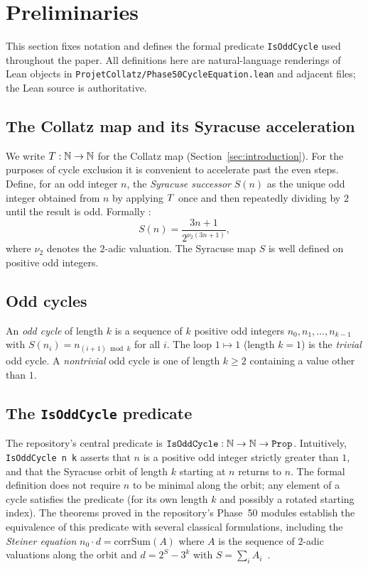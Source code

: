 
\section{Preliminaries}
\label{sec:preliminaries}

This section fixes notation and defines the formal predicate
\texttt{IsOddCycle} used throughout the paper. All definitions here are
natural-language renderings of Lean objects in
\texttt{ProjetCollatz/Phase50CycleEquation.lean} and adjacent files; the
Lean source is authoritative.

\subsection{The Collatz map and its Syracuse acceleration}

We write \(T : \mathbb{N} \to \mathbb{N}\) for the Collatz map
(Section~\ref{sec:introduction}). For the purposes of cycle exclusion it
is convenient to accelerate past the even steps. Define, for an odd
integer \(n\), the \emph{Syracuse successor} \(S(n)\) as the unique odd
integer obtained from \(n\) by applying \(T\) once and then
repeatedly dividing by \(2\) until the result is odd. Formally :
\[
S(n) = \frac{3n + 1}{2^{\nu_2(3n+1)}},
\]
where \(\nu_2\) denotes the \(2\)-adic valuation. The Syracuse map \(S\)
is well defined on positive odd integers.

\subsection{Odd cycles}

An \emph{odd cycle} of length \(k\) is a sequence of \(k\) positive odd
integers \(n_0, n_1, \ldots, n_{k-1}\) with
\(S(n_i) = n_{(i+1) \bmod k}\) for all \(i\). The loop
\(1 \mapsto 1\) (length \(k = 1\)) is the \emph{trivial} odd cycle.
A \emph{nontrivial} odd cycle is one of length \(k \geq 2\) containing a
value other than \(1\).

\subsection{The \texttt{IsOddCycle} predicate}

The repository's central predicate is
\(\mathtt{IsOddCycle} : \mathbb{N} \to \mathbb{N} \to \mathtt{Prop}\). Intuitively,
\texttt{IsOddCycle n k} asserts that \(n\) is a positive odd integer
strictly greater than \(1\), and that the Syracuse orbit of length
\(k\) starting at \(n\) returns to \(n\). The formal definition does
not require \(n\) to be minimal along the orbit; any element of a
cycle satisfies the predicate (for its own length \(k\) and possibly
a rotated starting index). The theorems proved in the repository's
Phase~50 modules establish the equivalence of this predicate with
several classical formulations, including the \emph{Steiner equation}
\(n_0 \cdot d = \text{corrSum}(A)\) where \(A\) is the sequence of
\(2\)-adic valuations along the orbit and \(d = 2^S - 3^k\) with
\(S = \sum_i A_i\)~\cite{Steiner1977}.

